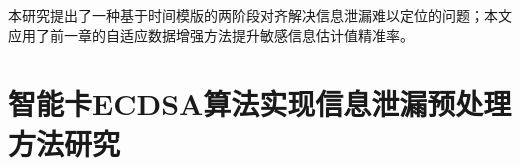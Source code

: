 {	本研究提出了一种基于时间模版的两阶段对齐解决信息泄漏难以定位的问题；本文应用了前一章的自适应数据增强方法提升敏感信息估计值精准率。
	
%	
%	
%	
%	
%	
%		
%	
	
	
	\section{智能卡ECDSA算法实现信息泄漏预处理方法研究}
	
}
